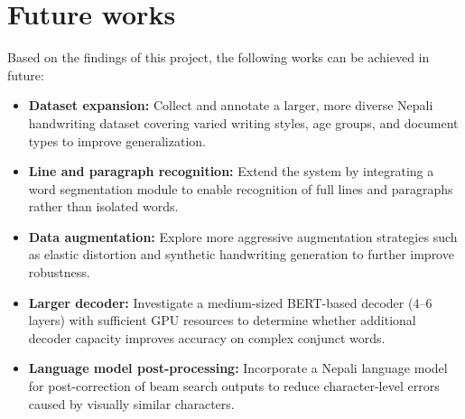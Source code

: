 \section{Future works}
Based on the findings of this project, the following works can be achieved in future:
\begin{itemize}
    \item \textbf{Dataset expansion:} Collect and annotate a larger, more diverse Nepali handwriting dataset covering varied writing styles, age groups, and document types to improve generalization.
    \item \textbf{Line and paragraph recognition:} Extend the system  by integrating a word segmentation module to enable recognition of full lines and paragraphs rather than isolated words.
    \item \textbf{Data augmentation:} Explore more aggressive augmentation strategies such as elastic distortion and synthetic handwriting generation to further improve robustness.
    \item \textbf{Larger decoder:} Investigate a medium-sized BERT-based decoder (4--6 layers) with sufficient GPU resources  to determine whether additional decoder capacity improves accuracy on complex conjunct words.
    \item \textbf{Language model post-processing:} Incorporate a Nepali language model for post-correction of beam search outputs to reduce character-level errors caused by visually similar characters.

\end{itemize}

